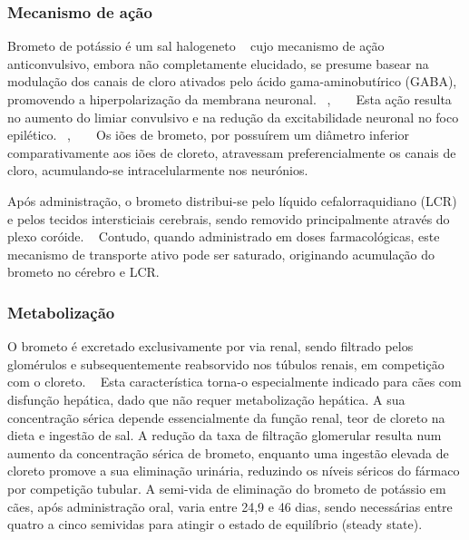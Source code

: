 \subsubsection{Mecanismo de ação}


Brometo de potássio é um sal halogeneto ~\cite{baird-heinz_systematic_2012} cujo mecanismo de ação anticonvulsivo, embora não completamente elucidado, se presume basear na modulação dos canais de cloro ativados pelo ácido gama-aminobutírico (GABA), promovendo a hiperpolarização da membrana neuronal. ~\cite{baird-heinz_systematic_2012}, ~\cite{Fantinati2021} ~\cite{Gouveia2024} Esta ação resulta no aumento do limiar convulsivo e na redução da excitabilidade neuronal no foco epilético. ~\cite{baird-heinz_systematic_2012}, ~\cite{Fantinati2021} ~\cite{Gouveia2024} Os iões de brometo, por possuírem um diâmetro inferior comparativamente aos iões de cloreto, atravessam preferencialmente os canais de cloro, acumulando-se intracelularmente nos neurónios. ~\cite{baird-heinz_systematic_2012} ~\cite{Gouveia2024} 


Após administração, o brometo distribui-se pelo líquido cefalorraquidiano (LCR) e pelos tecidos intersticiais cerebrais, sendo removido principalmente através do plexo coróide. ~\cite{baird-heinz_systematic_2012} Contudo, quando administrado em doses farmacológicas, este mecanismo de transporte ativo pode ser saturado, originando acumulação do brometo no cérebro e LCR. ~\cite{baird-heinz_systematic_2012}

\subsubsection{Metabolização}


O brometo é excretado exclusivamente por via renal, sendo filtrado pelos glomérulos e subsequentemente reabsorvido nos túbulos renais, em competição com o cloreto. ~\cite{Fantinati2021} Esta característica torna-o especialmente indicado para cães com disfunção hepática, dado que não requer metabolização hepática. A sua concentração sérica depende essencialmente da função renal, teor de cloreto na dieta e ingestão de sal. A redução da taxa de filtração glomerular resulta num aumento da concentração sérica de brometo, enquanto uma ingestão elevada de cloreto promove a sua eliminação urinária, reduzindo os níveis séricos do fármaco por competição tubular. A semi-vida de eliminação do brometo de potássio em cães, após administração oral, varia entre 24,9 e 46 dias, sendo necessárias entre quatro a cinco semividas para atingir o estado de equilíbrio (steady state).


